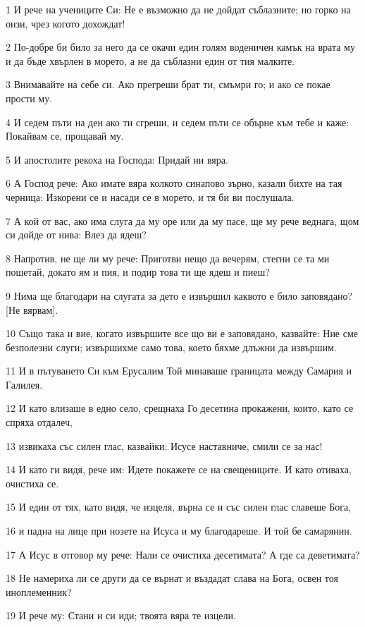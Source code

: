 \par 1 И рече на учениците Си: Не е възможно да не дойдат съблазните; но горко на онзи, чрез когото дохождат!
\par 2 По-добре би било за него да се окачи един голям воденичен камък на врата му и да бъде хвърлен в морето, а не да съблазни един от тия малките.
\par 3 Внимавайте на себе си. Ако прегреши брат ти, смъмри го; и ако се покае прости му.
\par 4 И седем пъти на ден ако ти сгреши, и седем пъти се обърне към тебе и каже: Покайвам се, прощавай му.
\par 5 И апостолите рекоха на Господа: Придай ни вяра.
\par 6 А Господ рече: Ако имате вяра колкото синапово зърно, казали бихте на тая черница: Изкорени се и насади се в морето, и тя би ви послушала.
\par 7 А кой от вас, ако има слуга да му оре или да му пасе, ще му рече веднага, щом си дойде от нива: Влез да ядеш?
\par 8 Напротив, не ще ли му рече: Приготви нещо да вечерям, стегни се та ми пошетай, докато ям и пия, и подир това ти ще ядеш и пиеш?
\par 9 Нима ще благодари на слугата за дето е извършил каквото е било заповядано? [Не вярвам].
\par 10 Също така и вие, когато извършите все що ви е заповядано, казвайте: Ние сме безполезни слуги; извършихме само това, което бяхме длъжни да извършим.
\par 11 И в пътуването Си към Ерусалим Той минаваше границата между Самария и Галилея.
\par 12 И като влизаше в едно село, срещнаха Го десетина прокажени, които, като се спряха отдалеч,
\par 13 извикаха със силен глас, казвайки: Исусе наставниче, смили се за нас!
\par 14 И като ги видя, рече им: Идете покажете се на свещениците. И като отиваха, очистиха се.
\par 15 И един от тях, като видя, че изцеля, върна се и със силен глас славеше Бога,
\par 16 и падна на лице при нозете на Исуса и му благодареше. И той бе самарянин.
\par 17 А Исус в отговор му рече: Нали се очистиха десетимата? А где са деветимата?
\par 18 Не намериха ли се други да се върнат и въздадат слава на Бога, освен тоя иноплеменник?
\par 19 И рече му: Стани и си иди; твоята вяра те изцели.

